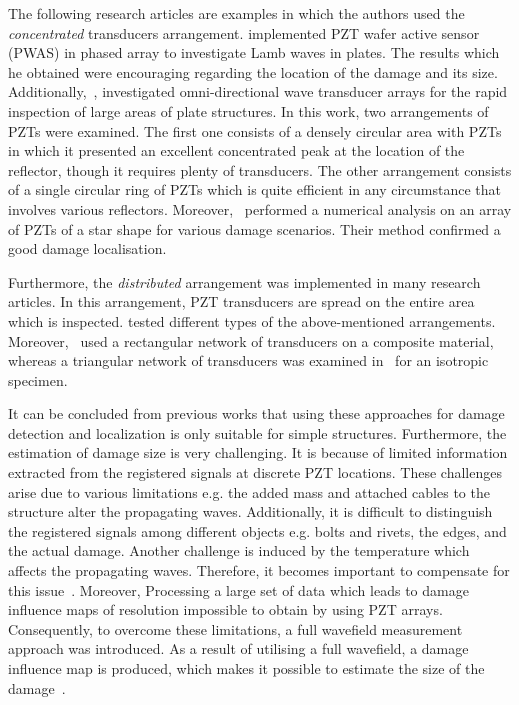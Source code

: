 The following research articles are examples in which the authors used the \emph{concentrated} transducers arrangement.
\textcite{Giurgiutiu2006} implemented PZT wafer active sensor (PWAS) in phased array to investigate Lamb waves in plates.
The results which he obtained were encouraging regarding the location of the damage and its size.
Additionally,~\textcite{Wilcox2003}, investigated omni-directional wave transducer arrays for the rapid inspection of large areas of plate structures. 
In this work, two arrangements of PZTs were examined. 
The first one consists of a densely circular area with PZTs in which it presented an excellent concentrated peak at the location of the reflector, though it requires plenty of transducers. 
The other arrangement consists of a single circular ring of PZTs which is quite efficient in any circumstance that involves various reflectors.
Moreover,~\textcite{Malinowski2009} performed a numerical analysis on an array of PZTs of a star shape for various damage scenarios. Their method confirmed a good damage localisation.

Furthermore, the \emph{distributed} arrangement was implemented in many research articles. 
In this arrangement, PZT transducers are spread on the entire area which is inspected.
\textcite{Schubert2008} tested different types of the above-mentioned arrangements. 
Moreover,~\textcite{Qiang2009} used a rectangular network of transducers
on a composite material, whereas a triangular network of transducers was examined in~\cite{Wandowski2009} for an isotropic specimen.

It can be concluded from previous works that using these approaches for damage detection and localization is only suitable for simple structures. 
Furthermore, the estimation of damage size is very challenging.
It is because of limited information extracted from the registered signals at discrete PZT locations. 
These challenges arise due to various limitations e.g. the added mass and attached cables to the structure alter the propagating waves. 
Additionally, it is difficult to distinguish the registered signals among different objects e.g. bolts and rivets, the edges, and the actual damage. Another challenge is induced by the temperature which affects the propagating waves. 
Therefore, it becomes important to compensate for this issue~\cite{Marzani1999}.
Moreover, Processing a large set of data which leads to damage influence maps of resolution impossible to obtain by using PZT arrays.
Consequently, to overcome these limitations, a full wavefield measurement approach was introduced. 
As a result of utilising a full wavefield, a damage influence map is produced, which makes it possible to estimate the size of the damage~\cite{Ostachowicz2014}.
